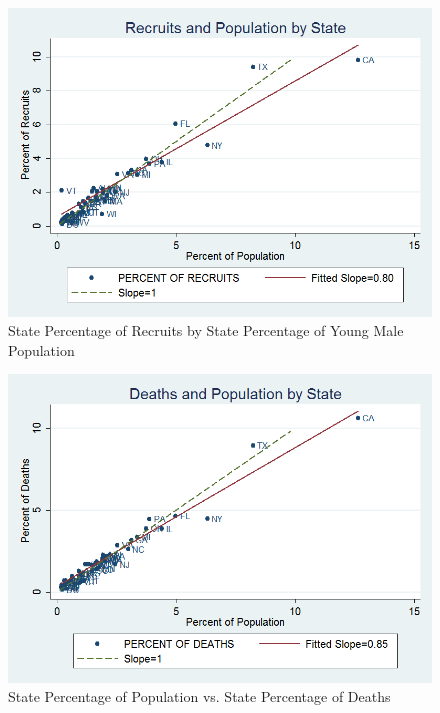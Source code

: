 \documentclass[12pt] {article}
\begin{document}
\begin{table}
\caption{}
\label{Flo:TABLE: Simple Time Series}
\end{table}

\begin{table}
\caption{}
\label{Flo:TABLE: Simple Time Series P}
\end{table}
\clearpage{}

\begin{figure}
\includegraphics[scale=0.6]{../Output/graph_table1_rec_pop}
\caption{State Percentage of Recruits by State Percentage of Young Male Population}
\label{Flo: Figure: Recruits vs. Population}
\end{figure}

\begin{figure}
\includegraphics[scale=0.6]{../Output/graph_table1_death_pop}
\caption{State Percentage of Population vs. State Percentage of Deaths}
\label{Flo:Figure: Pop vs. Deaths}
\end{figure}
\end{document}
